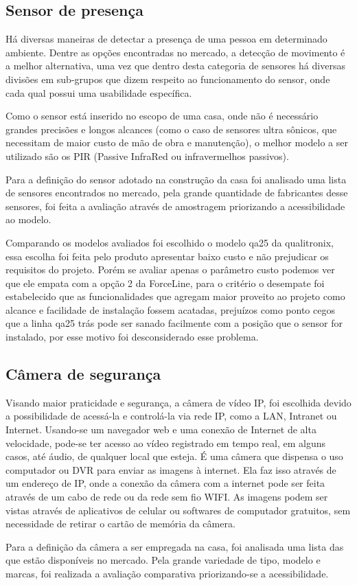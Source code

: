 \subsection{Sensor de presença}
\par Há diversas maneiras de detectar a presença de uma pessoa em determinado ambiente. Dentre as opções encontradas no mercado, a detecção de movimento é a melhor alternativa, uma vez que dentro desta categoria de sensores há diversas divisões em sub-grupos que dizem respeito ao funcionamento do sensor, onde cada qual possui uma usabilidade específica.
\par Como o sensor está inserido no escopo de uma casa, onde não é necessário grandes precisões e longos alcances (como o caso de sensores ultra sônicos, que necessitam de maior custo de mão de obra e manutenção), o melhor modelo a ser utilizado são os PIR (Passive InfraRed ou infravermelhos passivos).
\par Para a definição do sensor adotado na construção da casa foi analisado uma lista de sensores encontrados no mercado, pela grande quantidade de fabricantes desse sensores, foi feita a avaliação através de amostragem priorizando a acessibilidade ao modelo.


\par Comparando os modelos avaliados foi escolhido o modelo qa25 da qualitronix, essa escolha foi feita pelo produto apresentar baixo custo e não prejudicar os requisitos do projeto. Porém se avaliar apenas o parâmetro custo podemos ver que ele empata com a opção 2 da ForceLine, para o critério o desempate foi estabelecido que as funcionalidades que agregam maior proveito ao projeto como alcance e facilidade de instalação fossem acatadas, prejuízos como ponto cegos que a linha qa25 trás pode ser sanado facilmente com a posição que o sensor for instalado, por esse motivo foi desconsiderado esse problema.

\subsection{Câmera de segurança}
\par Visando maior praticidade e segurança, a câmera de vídeo IP, foi escolhida devido a possibilidade de acessá-la e controlá-la via rede IP, como a LAN, Intranet ou Internet. Usando-se um navegador web e uma conexão de Internet de alta velocidade, pode-se ter acesso ao vídeo registrado em tempo real, em alguns casos, até áudio, de qualquer local que esteja. É uma câmera que dispensa o uso computador ou DVR para enviar as imagens à internet. Ela faz isso através de um endereço de IP, onde a conexão da câmera com a internet pode ser feita através de um cabo de rede ou da rede sem fio WIFI. As imagens podem ser vistas através de aplicativos de celular ou softwares de computador gratuitos, sem necessidade de retirar o cartão de memória da câmera.
\par Para a definição da câmera a ser empregada na casa, foi analisada uma lista das que estão disponíveis no mercado. Pela grande variedade de tipo, modelo e marcas, foi realizada a avaliação comparativa priorizando-se a acessibilidade.


